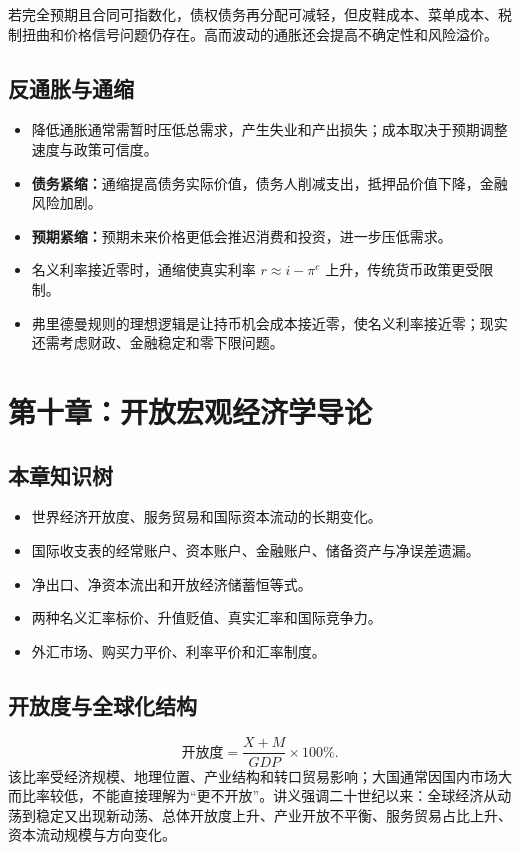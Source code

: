 \documentclass[UTF8,11pt,a4paper]{ctexart}
\newcommand{\term}[1]{\textbf{#1}}
\begin{document}
\begin{detailbox}
若完全预期且合同可指数化，债权债务再分配可减轻，但皮鞋成本、菜单成本、税制扭曲和价格信号问题仍存在。高而波动的通胀还会提高不确定性和风险溢价。
\end{detailbox}

\subsection{反通胀与通缩}
\begin{itemize}
  \item 降低通胀通常需暂时压低总需求，产生失业和产出损失；成本取决于预期调整速度与政策可信度。
  \item \term{债务紧缩：}通缩提高债务实际价值，债务人削减支出，抵押品价值下降，金融风险加剧。
  \item \term{预期紧缩：}预期未来价格更低会推迟消费和投资，进一步压低需求。
  \item 名义利率接近零时，通缩使真实利率 $r\approx i-\pi^e$ 上升，传统货币政策更受限制。
  \item 弗里德曼规则的理想逻辑是让持币机会成本接近零，使名义利率接近零；现实还需考虑财政、金融稳定和零下限问题。
\end{itemize}

\newpage
\section{第十章：开放宏观经济学导论}

\subsection{本章知识树}
\begin{itemize}
  \item 世界经济开放度、服务贸易和国际资本流动的长期变化。
  \item 国际收支表的经常账户、资本账户、金融账户、储备资产与净误差遗漏。
  \item 净出口、净资本流出和开放经济储蓄恒等式。
  \item 两种名义汇率标价、升值贬值、真实汇率和国际竞争力。
  \item 外汇市场、购买力平价、利率平价和汇率制度。
\end{itemize}

\subsection{开放度与全球化结构}
\[
\text{开放度}=\frac{X+M}{GDP}\times100\%.
\]
该比率受经济规模、地理位置、产业结构和转口贸易影响；大国通常因国内市场大而比率较低，不能直接理解为“更不开放”。讲义强调二十世纪以来：全球经济从动荡到稳定又出现新动荡、总体开放度上升、产业开放不平衡、服务贸易占比上升、资本流动规模与方向变化。
\end{document}
